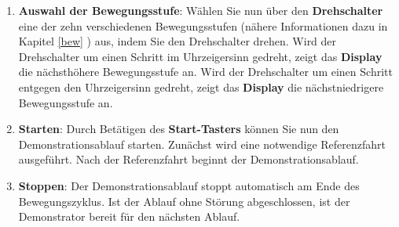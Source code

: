 \begin{enumerate}
\begin{center}
\end{center}
	
	\item \textbf{Auswahl der Bewegungsstufe}: Wählen Sie nun über den \textbf{Drehschalter} eine der zehn verschiedenen Bewegungsstufen (nähere Informationen dazu in Kapitel \ref{bew} ) aus, indem Sie den Drehschalter drehen. Wird der Drehschalter um einen Schritt im Uhrzeigersinn gedreht, zeigt das \textbf{Display} die nächsthöhere Bewegungsstufe an. Wird der Drehschalter um einen Schritt entgegen den Uhrzeigersinn gedreht, zeigt das \textbf{Display} die nächstniedrigere Bewegungsstufe an.	
	
	\item \textbf{Starten}: Durch Betätigen des \textbf{Start-Tasters} können Sie nun den Demonstrationsablauf starten. Zunächst wird eine notwendige Referenzfahrt ausgeführt. Nach der Referenzfahrt beginnt der Demonstrationsablauf.
	\begin{center}	
	\end{center}
	
	\item \textbf{Stoppen}: Der Demonstrationsablauf stoppt automatisch am Ende des Bewegungszyklus. Ist der Ablauf ohne Störung abgeschlossen, ist der Demonstrator bereit für den nächsten Ablauf.
\end{enumerate}


